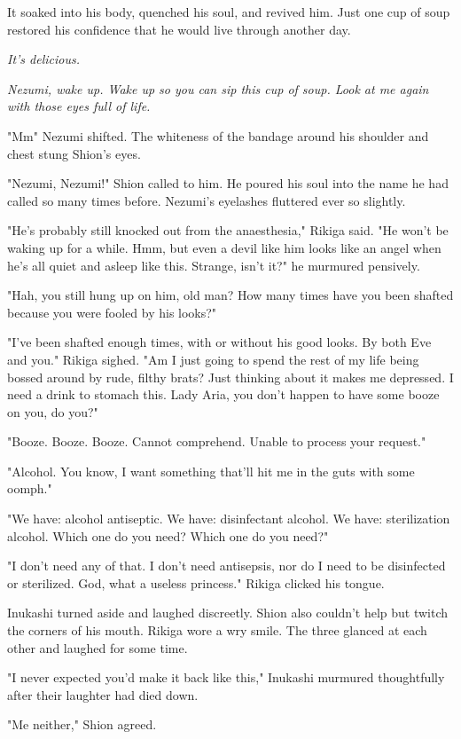 It soaked into his body, quenched his soul, and revived him. Just one
cup of soup restored his confidence that he would live through another
day.

\emph{It's delicious.}

\emph{Nezumi, wake up. Wake up so you can sip this cup of soup. Look at me
again with those eyes full of life.}

"Mm\el " Nezumi shifted. The whiteness of the bandage around his shoulder
and chest stung Shion's eyes.

"Nezumi, Nezumi!" Shion called to him. He poured his soul into the name
he had called so many times before. Nezumi's eyelashes fluttered ever so
slightly.

"He's probably still knocked out from the anaesthesia," Rikiga said. "He
won't be waking up for a while. Hmm, but even a devil like him looks
like an angel when he's all quiet and asleep like this. Strange, isn't
it?" he murmured pensively.

"Hah, you still hung up on him, old man? How many times have you been
shafted because you were fooled by his looks?"

"I've been shafted enough times, with or without his good looks. By both
Eve and you." Rikiga sighed. "Am I just going to spend the rest of my
life being bossed around by rude, filthy brats? Just thinking about it
makes me depressed. I need a drink to stomach this. Lady Aria, you don't
happen to have some booze on you, do you?"

{\sffamily "Booze. Booze. Booze. Cannot comprehend. Unable to process your
request."}

"Alcohol. You know, I want something that'll hit me in the guts with
some oomph."

{\sffamily "We have: alcohol antiseptic. We have: disinfectant alcohol. We have:
sterilization alcohol. Which one do you need? Which one do you need?"}

"I don't need any of that. I don't need antisepsis, nor do I need to be
disinfected or sterilized. God, what a useless princess." Rikiga clicked
his tongue.

Inukashi turned aside and laughed discreetly. Shion also couldn't help
but twitch the corners of his mouth. Rikiga wore a wry smile. The three
glanced at each other and laughed for some time.

"I never expected you'd make it back like this," Inukashi murmured
thoughtfully after their laughter had died down.

"Me neither," Shion agreed.

